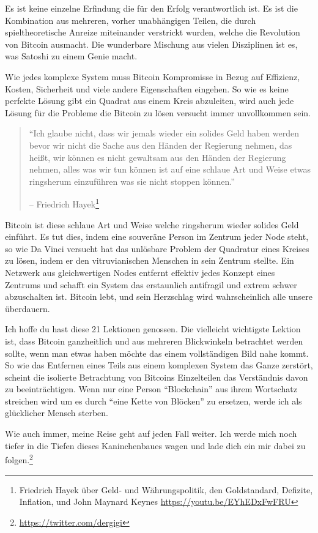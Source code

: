 Es ist keine einzelne Erfindung die für den Erfolg verantwortlich ist. Es ist
die Kombination aus mehreren, vorher unabhängigen Teilen, die durch
spieltheoretische Anreize miteinander verstrickt wurden, welche die Revolution
von Bitcoin ausmacht. Die wunderbare Mischung aus vielen Disziplinen ist es, was
Satoshi zu einem Genie macht.

Wie jedes komplexe System muss Bitcoin Kompromisse in Bezug auf
Effizienz, Kosten, Sicherheit und viele andere Eigenschaften eingehen. So wie es
keine perfekte Lösung gibt ein Quadrat aus einem Kreis abzuleiten, wird auch
jede Lösung für die Probleme die Bitcoin zu lösen versucht immer unvollkommen
sein.

\begin{quotation}\begin{samepage}
\enquote{Ich glaube nicht, dass wir jemals wieder ein solides Geld haben werden
bevor wir nicht die Sache aus den Händen der Regierung nehmen, das heißt, wir
können es nicht gewaltsam aus den Händen der Regierung nehmen, alles was wir tun
können ist auf eine schlaue Art und Weise etwas ringsherum einzuführen was sie
nicht stoppen können.}
\begin{flushright} -- Friedrich Hayek\footnote{Friedrich Hayek über Geld- und
Währungspolitik, den Goldstandard, Defizite, Inflation, und John Maynard Keynes
\url{https://youtu.be/EYhEDxFwFRU}}
\end{flushright}\end{samepage}\end{quotation}

Bitcoin ist diese schlaue Art und Weise welche ringsherum wieder solides Geld
einführt. Es tut dies, indem eine souveräne Person im Zentrum jeder Node steht,
so wie Da Vinci versucht hat das unlösbare Problem der Quadratur eines Kreises
zu lösen, indem er den vitruvianischen Menschen in sein Zentrum stellte. Ein
Netzwerk aus gleichwertigen Nodes entfernt effektiv jedes Konzept eines Zentrums
und schafft ein System das erstaunlich antifragil und extrem schwer abzuschalten
ist. Bitcoin lebt, und sein Herzschlag wird wahrscheinlich alle unsere
überdauern.

Ich hoffe du hast diese 21 Lektionen genossen. Die vielleicht wichtigste Lektion
ist, dass Bitcoin ganzheitlich und aus mehreren Blickwinkeln betrachtet werden
sollte, wenn man etwas haben möchte das einem vollständigen Bild nahe kommt. So
wie das Entfernen eines Teils aus einem komplexen System das Ganze zerstört,
scheint die isolierte Betrachtung von Bitcoins Einzelteilen das Verständnis
davon zu beeinträchtigen. Wenn nur eine Person \enquote{Blockchain} aus ihrem
Wortschatz streichen wird um es durch \enquote{eine Kette von Blöcken} zu
ersetzen, werde ich als glücklicher Mensch sterben.

Wie auch immer, meine Reise geht auf jeden Fall weiter. Ich werde mich noch
tiefer in die Tiefen dieses Kaninchenbaues wagen und lade dich ein mir dabei zu
folgen.\footnote{\url{https://twitter.com/dergigi}}

%

